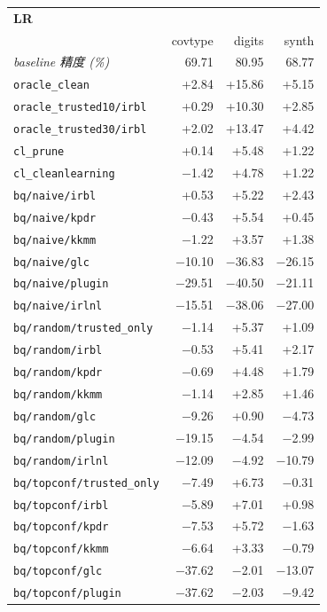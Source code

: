 \begin{tabular}{lrrr}
\toprule
\multicolumn{4}{l}{\textbf{LR}} \\
 & covtype & digits & synth \\
\midrule
\textit{baseline 精度 (\%)} & 69.71 & 80.95 & 68.77 \\
\addlinespace
\texttt{oracle\_clean} & +2.84 & +15.86 & +5.15 \\
\texttt{oracle\_trusted10/irbl} & +0.29 & +10.30 & +2.85 \\
\texttt{oracle\_trusted30/irbl} & +2.02 & +13.47 & +4.42 \\
\texttt{cl\_prune} & +0.14 & +5.48 & +1.22 \\
\texttt{cl\_cleanlearning} & $-$1.42 & +4.78 & +1.22 \\
\texttt{bq/naive/irbl} & +0.53 & +5.22 & +2.43 \\
\texttt{bq/naive/kpdr} & $-$0.43 & +5.54 & +0.45 \\
\texttt{bq/naive/kkmm} & $-$1.22 & +3.57 & +1.38 \\
\texttt{bq/naive/glc} & $-$10.10 & $-$36.83 & $-$26.15 \\
\texttt{bq/naive/plugin} & $-$29.51 & $-$40.50 & $-$21.11 \\
\texttt{bq/naive/irlnl} & $-$15.51 & $-$38.06 & $-$27.00 \\
\texttt{bq/random/trusted\_only} & $-$1.14 & +5.37 & +1.09 \\
\texttt{bq/random/irbl} & $-$0.53 & +5.41 & +2.17 \\
\texttt{bq/random/kpdr} & $-$0.69 & +4.48 & +1.79 \\
\texttt{bq/random/kkmm} & $-$1.14 & +2.85 & +1.46 \\
\texttt{bq/random/glc} & $-$9.26 & +0.90 & $-$4.73 \\
\texttt{bq/random/plugin} & $-$19.15 & $-$4.54 & $-$2.99 \\
\texttt{bq/random/irlnl} & $-$12.09 & $-$4.92 & $-$10.79 \\
\texttt{bq/topconf/trusted\_only} & $-$7.49 & +6.73 & $-$0.31 \\
\texttt{bq/topconf/irbl} & $-$5.89 & +7.01 & +0.98 \\
\texttt{bq/topconf/kpdr} & $-$7.53 & +5.72 & $-$1.63 \\
\texttt{bq/topconf/kkmm} & $-$6.64 & +3.33 & $-$0.79 \\
\texttt{bq/topconf/glc} & $-$37.62 & $-$2.01 & $-$13.07 \\
\texttt{bq/topconf/plugin} & $-$37.62 & $-$2.03 & $-$9.42 \\

\end{tabular}
